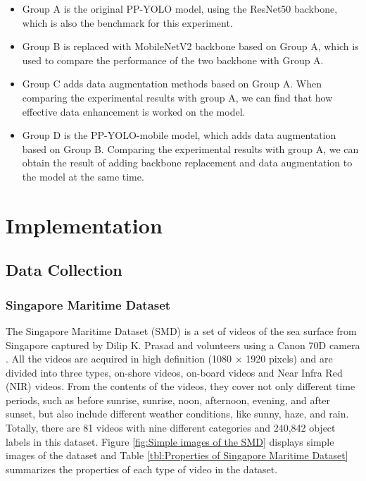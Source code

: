 \documentclass[sensors,article,submit,moreauthors,pdftex]{Definitions/mdpi}
\begin{document}
\begin{itemize}
\item{Group A is the original PP-YOLO model, using the ResNet50 backbone, which is also the benchmark for this experiment.}
\end{itemize}


\begin{itemize}
\item{Group B is replaced with MobileNetV2 backbone based on Group A, which is used to compare the performance of the two backbone with Group A.}
\end{itemize}

\begin{itemize}
\item{Group C adds data augmentation methods based on Group A. When comparing the experimental results with group A, we can find that how effective data enhancement is worked on the model.}
\end{itemize}

\begin{itemize}
\item{Group D is the PP-YOLO-mobile model, which adds data augmentation based on Group B. Comparing the experimental results with group A, we can obtain the result of adding backbone replacement and data augmentation to the model at the same time.}
\end{itemize}


\section{Implementation}
\subsection{Data Collection}

\subsubsection{Singapore Maritime Dataset}
The Singapore Maritime Dataset (SMD) is a set of videos of the sea surface from Singapore captured by Dilip K. Prasad and volunteers using a Canon 70D camera \cite{prasad2017video}. All the videos are acquired in high definition (1080 $\times$ 1920 pixels) and are divided into three types, on-shore videos, on-board videos and Near Infra Red (NIR) videos. From the contents of the videos, they cover not only different time periods, such as before sunrise, sunrise, noon, afternoon, evening, and after sunset, but also include different weather conditions, like sunny, haze, and rain. Totally, there are 81 videos with nine different categories and 240,842 object labels in this dataset. Figure \ref{fig:Simple images of the SMD} displays simple images of the dataset and Table \ref{tbl:Properties of Singapore Maritime Dataset} summarizes the properties of each type of video in the dataset.
\end{document}

